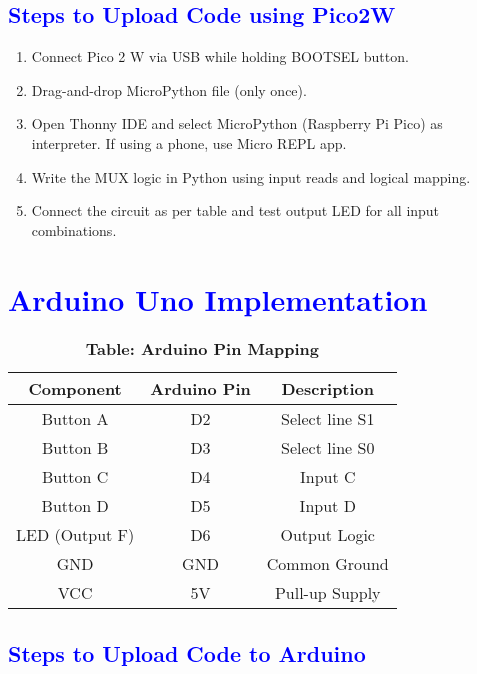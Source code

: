 \documentclass[twocolumn]{article}
\begin{document}
\subsection*{\textcolor{blue}{Steps to Upload Code using Pico2W}}

\begin{enumerate}
    \item Connect Pico 2 W via USB while holding BOOTSEL button.
    \item Drag-and-drop MicroPython file (only once).
    \item Open Thonny IDE and select MicroPython (Raspberry Pi Pico) as interpreter. If using a phone, use Micro REPL app.
    \item Write the MUX logic in Python using input reads and logical mapping.
    \item Connect the circuit as per table and test output LED for all input combinations.
\end{enumerate}
\section*{\textcolor{blue}{Arduino Uno Implementation}}


\begin{table}%
\centering
\renewcommand{\arraystretch}{1.3}
\begin{tabular}{|c|c|c|}
\hline
\textbf{Component} & \textbf{Arduino Pin} & \textbf{Description} \\
\hline
Button A & D2 & Select line S1 \\
Button B & D3 & Select line S0 \\
Button C & D4 & Input C \\
Button D & D5 & Input D \\
LED (Output F) & D6 & Output Logic \\
GND & GND & Common Ground \\
VCC & 5V & Pull-up Supply \\
\hline
\end{tabular}
\caption*{\textbf{Table: Arduino Pin Mapping}}
\end{table}

\subsection*{\textcolor{blue}{Steps to Upload Code to Arduino}}
\end{document}
